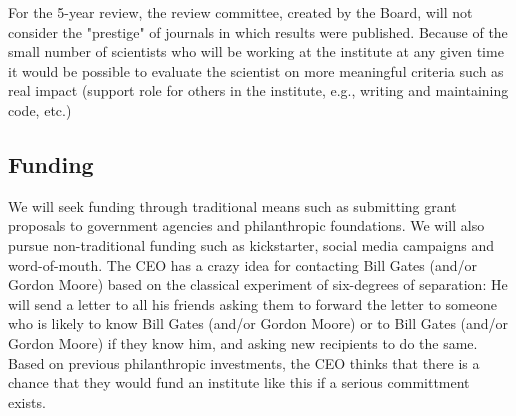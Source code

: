 For the 5-year review, the review committee, created by the Board, will not consider the "prestige" of journals in which results were published. Because of the small number of scientists who will be working at the institute at any given time it would be possible to evaluate the scientist on more meaningful criteria such as real impact (support role for others in the institute, e.g., writing and maintaining code, etc.)

\subsection{Funding}

We will seek funding through traditional means such as submitting grant proposals to government agencies and philanthropic foundations. We will also pursue non-traditional funding such as kickstarter, social media campaigns and word-of-mouth. The CEO has a crazy idea for contacting Bill Gates (and/or Gordon Moore) based on the classical experiment of six-degrees of separation: He will send a letter to all his friends asking them to forward the letter to someone who is likely to know Bill Gates (and/or Gordon Moore) or to Bill Gates (and/or Gordon Moore) if they know him, and asking new recipients to do the same. Based on previous philanthropic investments, the CEO thinks that there is a chance that they would fund an institute like this if a serious committment exists.

